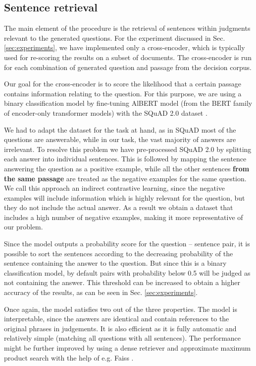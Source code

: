 \subsection{Sentence retrieval}

The main element of the procedure is the retrieval of sentences within judgments relevant to the generated questions. For the experiment discussed in Sec. \ref{sec:experiments}, we have implemented only a cross-encoder, which is typically used for re-scoring the results on a subset of documents. The cross-encoder is run for each combination of generated question and 
passage from the decision corpus. 

Our goal for the cross-encoder is to score the likelihood that a certain passage contains information relating to the question.
For this purpose, we are using a binary classification model by fine-tuning AlBERT \cite{lan2019albert} model (from the BERT family
\cite{devlin2018bert} of encoder-only transformer models) with the SQuAD 2.0 dataset \cite{rajpurkar2018know}.

We had to adapt the dataset for the task at hand, as in SQuAD most of the questions are answerable, while in our task, the vast majority of answers are irrelevant. To resolve this problem we have pre-processed SQuAD 2.0 by splitting each answer into individual sentences. This is followed by mapping the sentence answering the question as a positive example, while all the other sentences \textbf{from the same passage} are treated as the negative examples for the same question.
We call this approach an indirect contrastive learning, since the negative examples will include information 
which is highly relevant for the question, but they do not include the actual answer. As a result we obtain a dataset that includes a high number of negative examples, making it more representative of our problem.

Since the model outputs a probability score for the question -- sentence pair, it is possible to sort the sentences according
to the decreasing probability of the sentence containing the answer to the question. But since this is a binary classification
model, by default pairs with probability below 0.5 will be judged as not containing the answer. This threshold can be increased
to obtain a higher accuracy of the results, as can be seen in Sec. \ref{sec:experiments}. 

Once again, the model satisfies two out of the three properties. The model is interpretable, since the answers are identical and contain references to the original phrases in judgements. It is also efficient as it is fully automatic and relatively simple (matching all questions with all sentences). The performance might be further improved by using a dense retriever \cite{karpukhin2020dense}
and approximate maximum product search with the help of e.g. Faiss \cite{johnson2019billion}.

